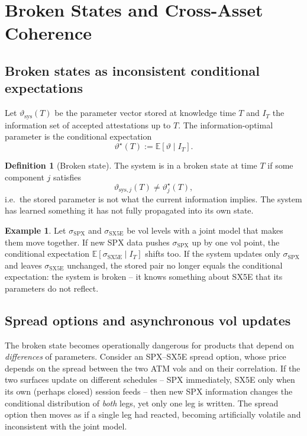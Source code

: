 \documentclass[11pt]{book}
\theoremstyle{plain}
\theoremstyle{definition}
\newtheorem{definition}[theorem]{Definition}
\newtheorem{example}[theorem]{Example}
\theoremstyle{remark}
\newcommand{\parvec}{\vartheta}                  %
\newcommand{\E}{\mathbb{E}}
\begin{document}
\section{Broken States and Cross-Asset Coherence}
\label{sec:broken}

\subsection{Broken states as inconsistent conditional expectations}

Let $\parvec_{\text{sys}}(T)$ be the parameter vector stored at knowledge time $T$
and $I_T$ the information set of accepted attestations up to $T$. The
information-optimal parameter is the conditional expectation
\[
    \parvec^\star(T) := \E[\parvec\mid I_T].
\]

\begin{definition}[Broken state]
The system is in a broken state at time $T$ if some component $j$ satisfies
\[
    \parvec_{\text{sys},j}(T) \neq \parvec^\star_j(T),
\]
i.e.\ the stored parameter is not what the current information implies. The system
has learned something it has not fully propagated into its own state.
\end{definition}

\begin{example}
Let $\sigma_{\mathrm{SPX}}$ and $\sigma_{\mathrm{SX5E}}$ be vol levels with a joint
model that makes them move together. If new SPX data pushes
$\sigma_{\mathrm{SPX}}$ up by one vol point, the conditional expectation
$\E[\sigma_{\mathrm{SX5E}}\mid I_T]$ shifts too. If the system updates only
$\sigma_{\mathrm{SPX}}$ and leaves $\sigma_{\mathrm{SX5E}}$ unchanged, the stored
pair no longer equals the conditional expectation: the system is broken -- it
knows something about SX5E that its parameters do not reflect.
\end{example}

\subsection{Spread options and asynchronous vol updates}

The broken state becomes operationally dangerous for products that depend on
\emph{differences} of parameters. Consider an SPX--SX5E spread option, whose price
depends on the spread between the two ATM vols and on their correlation. If the
two surfaces update on different schedules -- SPX immediately, SX5E only when its
own (perhaps closed) session feeds -- then new SPX information changes the
conditional distribution of \emph{both} legs, yet only one leg is written. The
spread option then moves as if a single leg had reacted, becoming artificially
volatile and inconsistent with the joint model.
\end{document}
